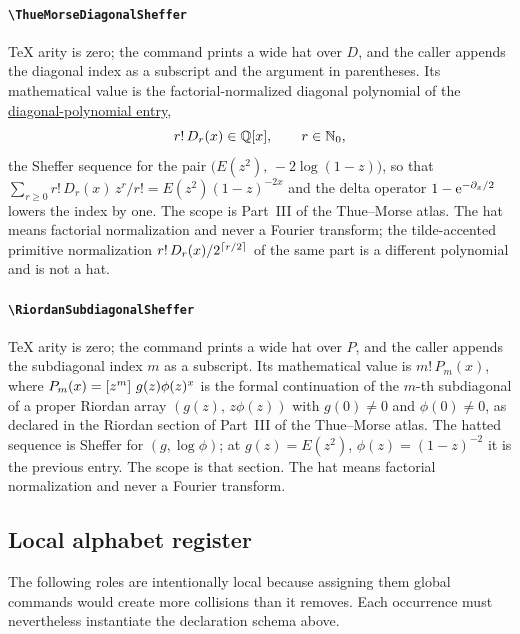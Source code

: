 \documentclass[11pt,oneside]{article}
\theoremstyle{definition}
\theoremstyle{remark}
\DeclareRobustCommand{\commandname}[1]{\texttt{\textbackslash#1}}
\DeclareRobustCommand{\localaccentname}[1]{\commandname{#1}}
\begin{document}
\paragraph{\localaccentname{ThueMorseDiagonalSheffer}}
\hypertarget{notation:local-hat-ThueMorseDiagonalSheffer}{}%
TeX arity is zero; the command prints a wide hat over \(D\), and the caller
appends the diagonal index as a subscript and the argument in parentheses.
Its mathematical value is the factorial-normalized diagonal polynomial of
the \hyperlink{notation:thue-morse-diagonal-polynomial}{diagonal-polynomial
entry},
\[
 r!\,D_r(x)\in\mathbb{Q}[x],\qquad r\in\mathbb{N}_{0},
\]
the Sheffer sequence for the pair \(\bigl(E(z^2),\,-2\log(1-z)\bigr)\), so that
\(\sum_{r\ge0}r!\,D_r(x)\,z^r/r!=E(z^2)(1-z)^{-2x}\) and the delta operator
\(1-\mathrm{e}^{-\partial_x/2}\) lowers the index by one.  The scope is Part~III of
the Thue--Morse atlas.  The hat means factorial normalization and never a
Fourier transform; the tilde-accented primitive normalization
\(r!\,D_r(x)/2^{\left\lceil r/2\right\rceil}\) of the same part is a different
polynomial and is not a hat.

\paragraph{\localaccentname{RiordanSubdiagonalSheffer}}
TeX arity is zero; the command prints a wide hat over \(P\), and the caller
appends the subdiagonal index \(m\) as a subscript.  Its mathematical value is
\(m!\,P_m(x)\), where \(P_m(x)=\left[z^{m}\right]\,g(z)\phi(z)^{x}\) is the
formal continuation of the \(m\)-th subdiagonal of a proper Riordan array
\((g(z),\,z\phi(z))\) with \(g(0)\ne0\) and \(\phi(0)\ne0\), as declared in the
Riordan section of Part~III of the Thue--Morse atlas.  The hatted sequence is
Sheffer for \((g,\log\phi)\); at \(g(z)=E(z^2)\), \(\phi(z)=(1-z)^{-2}\) it is
the previous entry.  The scope is that section.  The hat means factorial
normalization and never a Fourier transform.

\subsection{Local alphabet register}

The following roles are intentionally local because assigning them global commands would
create more collisions than it removes.  Each occurrence must nevertheless instantiate
the declaration schema above.
\end{document}
